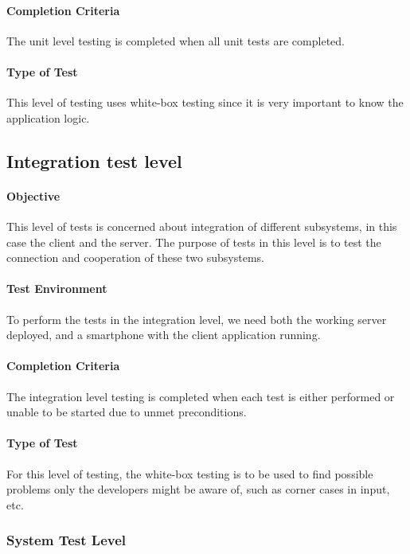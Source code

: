 \documentclass[11pt]{book}
\begin{document}
\paragraph{Completion Criteria}
The unit level testing is completed when all unit tests are completed.

\paragraph{Type of Test}
This level of testing uses white-box testing since it is very important to know the application logic.


\subsection{Integration test level}

\paragraph{Objective}
This level of tests is concerned about integration of different subsystems, in this case the client and the server. The purpose of tests in this level is to test the connection and cooperation of these two subsystems.

\paragraph{Test Environment}
To perform the tests in the integration level, we need both the working server deployed, and a smartphone with the client application running.

\paragraph{Completion Criteria}
The integration level testing is completed when each test is either performed or unable to be started due to unmet preconditions.

\paragraph{Type of Test}
For this level of testing, the white-box testing is to be used to find possible problems only the developers might be aware of, such as corner cases in input, etc.


\subsubsection{System Test Level}
\end{document}
